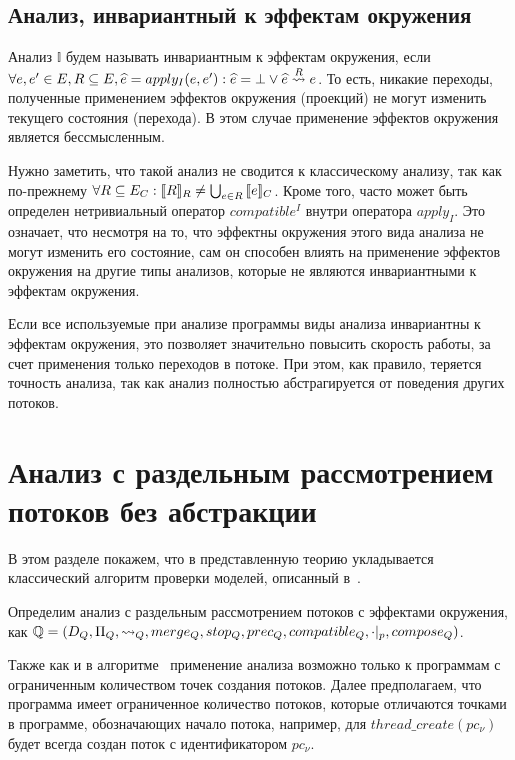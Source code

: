\subsection{Анализ, инвариантный к эффектам окружения}
\label{sect_inv_analysis}

Анализ $\mathbb{I}$ будем называть инвариантным к эффектам окружения, если $\forall e, e' \in E, R \subseteq E, \widehat{e} = apply_I(e, e'): \widehat{e} = \bot \lor \widehat{e} \stackrel{R}{\leadsto} e$.
То есть, никакие переходы, полученные применением эффектов окружения (проекций) не могут изменить текущего состояния (перехода). 
В этом случае применение эффектов окружения является бессмысленным.

Нужно заметить, что такой анализ не сводится к классическому анализу, так как по-прежнему $\forall R\subseteq E_C: [\![ R ]\!]_R \neq \bigcup_{e\in R}{[\![ e ]\!]_C}$.
Кроме того, часто может быть определен нетривиальный оператор $compatible^{I}$ внутри оператора $apply_I$. 
Это означает, что несмотря на то, что эффектны окружения этого вида анализа не могут изменить его состояние, сам он способен влиять на применение эффектов окружения на другие типы анализов, которые не являются инвариантными к эффектам окружения.

Если все используемые при анализе программы виды анализа инвариантны к эффектам окружения, это позволяет значительно повысить скорость работы, за счет применения только переходов в потоке.
При этом, как правило, теряется точность анализа, так как анализ полностью абстрагируется от поведения других потоков.

\section{Анализ с раздельным рассмотрением потоков без абстракции}

В этом разделе покажем, что в представленную теорию укладывается классический алгоритм проверки моделей, описанный в~\cite{ThreadModular03}.

Определим анализ с раздельным рассмотрением потоков с эффектами окружения, как
$\mathbb{Q}=(D_{Q}, \Pi_{Q}, \leadsto_{Q}, merge_{Q}, stop_{Q}, prec_{Q}, compatible_{Q}, \cdot|_p, compose_Q)$.

Также как и в алгоритме~\cite{ThreadModular03} применение анализа возможно только к программам с ограниченным количеством точек создания потоков. Далее предполагаем, что программа имеет ограниченное количество потоков, которые отличаются точками в программе, обозначающих начало потока, например, для $thread\_create(pc_\nu)$ будет всегда создан поток с идентификатором $pc_\nu$.

